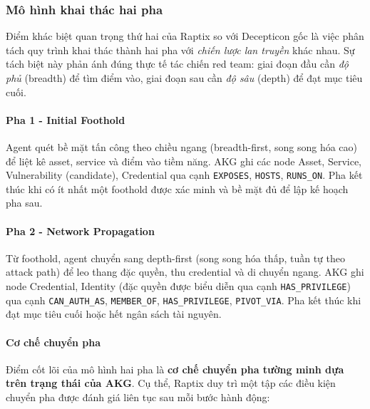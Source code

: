 
\subsubsection{Mô hình khai thác hai pha}
\label{sec:mo-hinh-hai-pha}

Điểm khác biệt quan trọng thứ hai của Raptix so với Decepticon gốc là việc phân tách quy trình khai thác thành hai pha với \emph{chiến lược lan truyền} khác nhau. Sự tách biệt này phản ánh đúng thực tế tác chiến red team: giai đoạn đầu cần \emph{độ phủ} (breadth) để tìm điểm vào, giai đoạn sau cần \emph{độ sâu} (depth) để đạt mục tiêu cuối.

\paragraph{Pha 1 - Initial Foothold}

Agent quét bề mặt tấn công theo chiều ngang (breadth-first, song song hóa cao) để liệt kê asset, service và điểm vào tiềm năng. AKG ghi các node Asset, Service, Vulnerability (candidate), Credential qua cạnh \texttt{EXPOSES}, \texttt{HOSTS}, \texttt{RUNS\_ON}. Pha kết thúc khi có ít nhất một foothold được xác minh và bề mặt đủ để lập kế hoạch pha sau.

\paragraph{Pha 2 - Network Propagation}

Từ foothold, agent chuyển sang depth-first (song song hóa thấp, tuần tự theo attack path) để leo thang đặc quyền, thu credential và di chuyển ngang. AKG ghi node Credential, Identity (đặc quyền được biểu diễn qua cạnh \texttt{HAS\_PRIVILEGE}) qua cạnh \texttt{CAN\_AUTH\_AS}, \texttt{MEMBER\_OF}, \texttt{HAS\_PRIVILEGE}, \texttt{PIVOT\_VIA}. Pha kết thúc khi đạt mục tiêu cuối hoặc hết ngân sách tài nguyên.

\paragraph{Cơ chế chuyển pha}

Điểm cốt lõi của mô hình hai pha là \textbf{cơ chế chuyển pha tường minh dựa trên trạng thái của AKG}. Cụ thể, Raptix duy trì một tập các điều kiện chuyển pha được đánh giá liên tục sau mỗi bước hành động:

